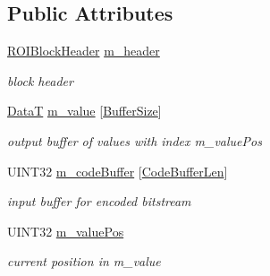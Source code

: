 \subsection*{Public Attributes}
\begin{DoxyCompactItemize}
\item 
\mbox{\hyperlink{unionROIBlockHeader}{R\+O\+I\+Block\+Header}} \mbox{\hyperlink{classCDecoder_1_1CMacroBlock_a19247bd5e6073252c45abf9d33b44ee0}{m\+\_\+header}}
\begin{DoxyCompactList}\small\item\em block header \end{DoxyCompactList}\item 
\mbox{\hyperlink{PGFtypes_8h_acb1ee3f52ccfad782dcaa0abd79e5d05}{DataT}} \mbox{\hyperlink{classCDecoder_1_1CMacroBlock_a7722de1000647fb5a894db2e2f348bdd}{m\+\_\+value}} \mbox{[}\mbox{\hyperlink{PGFtypes_8h_aa362edf6db9662acf6ef958a6db19c35}{Buffer\+Size}}\mbox{]}
\begin{DoxyCompactList}\small\item\em output buffer of values with index m\+\_\+value\+Pos \end{DoxyCompactList}\item 
U\+I\+N\+T32 \mbox{\hyperlink{classCDecoder_1_1CMacroBlock_ace0702d7f8281972b1db091248c3c80b}{m\+\_\+code\+Buffer}} \mbox{[}\mbox{\hyperlink{Encoder_8h_a05a74e73e6c734fcad194efbca053ed5}{Code\+Buffer\+Len}}\mbox{]}
\begin{DoxyCompactList}\small\item\em input buffer for encoded bitstream \end{DoxyCompactList}\item 
U\+I\+N\+T32 \mbox{\hyperlink{classCDecoder_1_1CMacroBlock_a38f42e9e2d5ac8387db0122aecac79be}{m\+\_\+value\+Pos}}
\begin{DoxyCompactList}\small\item\em current position in m\+\_\+value \end{DoxyCompactList}\end{DoxyCompactItemize}
